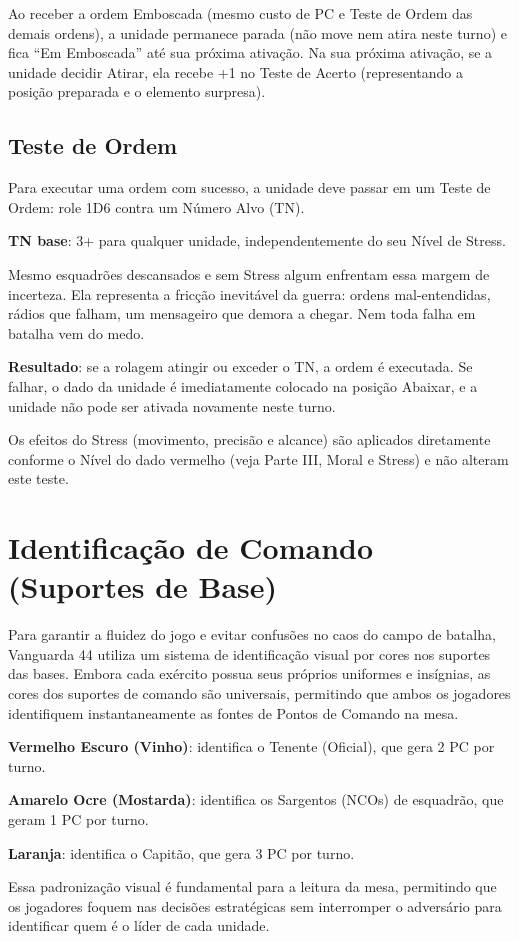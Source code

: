 \begin{nota}
Ao receber a ordem Emboscada (mesmo custo de PC e Teste de Ordem das demais ordens), a unidade permanece parada (não move nem atira neste turno) e fica ``Em Emboscada'' até sua próxima ativação. Na sua próxima ativação, se a unidade decidir Atirar, ela recebe +1 no Teste de Acerto (representando a posição preparada e o elemento surpresa).
\end{nota}

\subsection{Teste de Ordem}

Para executar uma ordem com sucesso, a unidade deve passar em um Teste de Ordem: role 1D6 contra um Número Alvo (TN).

\textbf{TN base}: 3+ para qualquer unidade, independentemente do seu Nível de Stress.

Mesmo esquadrões descansados e sem Stress algum enfrentam essa margem de incerteza. Ela representa a fricção inevitável da guerra: ordens mal-entendidas, rádios que falham, um mensageiro que demora a chegar. Nem toda falha em batalha vem do medo.

\textbf{Resultado}: se a rolagem atingir ou exceder o TN, a ordem é executada. Se falhar, o dado da unidade é imediatamente colocado na posição Abaixar, e a unidade não pode ser ativada novamente neste turno.

\begin{nota}
Os efeitos do Stress (movimento, precisão e alcance) são aplicados diretamente conforme o Nível do dado vermelho (veja Parte III, Moral e Stress) e não alteram este teste.
\end{nota}

\section{Identificação de Comando (Suportes de Base)}

Para garantir a fluidez do jogo e evitar confusões no caos do campo de batalha, Vanguarda 44 utiliza um sistema de identificação visual por cores nos suportes das bases. Embora cada exército possua seus próprios uniformes e insígnias, as cores dos suportes de comando são universais, permitindo que ambos os jogadores identifiquem instantaneamente as fontes de Pontos de Comando na mesa.

\textbf{Vermelho Escuro (Vinho)}: identifica o Tenente (Oficial), que gera 2 PC por turno.

\textbf{Amarelo Ocre (Mostarda)}: identifica os Sargentos (NCOs) de esquadrão, que geram 1 PC por turno.

\textbf{Laranja}: identifica o Capitão, que gera 3 PC por turno.

Essa padronização visual é fundamental para a leitura da mesa, permitindo que os jogadores foquem nas decisões estratégicas sem interromper o adversário para identificar quem é o líder de cada unidade.
